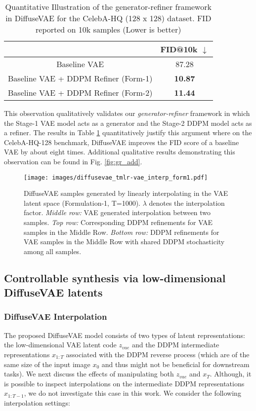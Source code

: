 \documentclass[10pt]{article} \usepackage[accepted]{tmlr}
\begin{document}
\begin{table}[H]
\small
\centering
\begin{tabular}{@{}cc@{}}
\toprule
                    & FID@10k $\downarrow$ \\ \midrule
Baseline VAE        & 87.28   \\
Baseline VAE + DDPM Refiner (Form-1) & \textbf{10.87}   \\
Baseline VAE + DDPM Refiner (Form-2) & \textbf{11.44}   \\ \bottomrule
\end{tabular}
\caption{Quantitative Illustration of the generator-refiner framework in DiffuseVAE for the CelebA-HQ (128 x 128) dataset. FID reported on 10k samples (Lower is better)}
\label{table:gr}
\end{table}

This observation qualitatively validates our \textit{generator-refiner} framework in which the Stage-1 VAE model acts as a generator and the Stage-2 DDPM model acts as a refiner. The results in Table \ref{table:gr} quantitatively justify this argument where on the CelebA-HQ-128 benchmark, DiffuseVAE improves the FID score of a baseline VAE by about eight times. Additional qualitative results demonstrating this observation can be found in Fig. \ref{fig:gr_add}.

\begin{figure*}
  \centering
    \texttt{[image: images/diffusevae\_tmlr-vae\_interp\_form1.pdf]}
    \caption{DiffuseVAE samples generated by linearly interpolating in the VAE latent space (Formulation-1, T=1000). $\lambda$ denotes the interpolation factor. \emph{Middle row:} VAE generated interpolation between two samples. \emph{Top row:} Corresponding DDPM refinements for VAE samples in the Middle Row. \emph{Bottom row:} DDPM refinements for VAE samples in the Middle Row with shared DDPM stochasticity among all samples.}
    \label{fig:interpolate_vae}
\end{figure*}

\subsection{Controllable synthesis via low-dimensional DiffuseVAE latents}
\label{subsec:exp_controllable}

\noindent
\subsubsection{DiffuseVAE Interpolation}
The proposed DiffuseVAE model consists of two types of latent representations: the low-dimensional VAE latent code $z_{vae}$ and the DDPM intermediate representations $x_{1:T}$ associated with the DDPM reverse process (which are of the same size of the input image $x_0$ and thus might not be beneficial for downstream tasks). We next discuss the effects of manipulating both $z_{vae}$ and $x_T$. Although, it is possible to inspect interpolations on the intermediate DDPM representations $x_{1:T-1}$, we do not investigate this case in this work. We consider the following interpolation settings:
\end{document}

